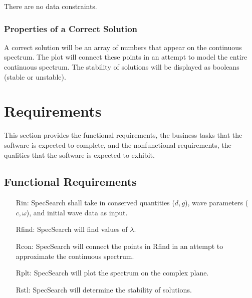 \documentclass[12pt]{article}
\begin{document}
There are no data constraints. 

\subsubsection{Properties of a Correct Solution} \label{sec_CorrectSolution}

\noindent
A correct solution will be an array of numbers that appear on the continuous 
spectrum. The plot will connect these points in an attempt to model the entire 
continuous spectrum. The stability of solutions will be displayed as booleans 
(stable or unstable).


\section{Requirements}

This section provides the functional requirements, the business tasks that the
software is expected to complete, and the nonfunctional requirements, the
qualities that the software is expected to exhibit.

\subsection{Functional Requirements}

\noindent \begin{itemize}

\item[Rin:] SpecSearch shall 
take in 
conserved quantities ($d,g$), wave parameters ($c,\omega$), and initial wave 
data 
as input. 

\item[Rfind:] SpecSearch 
will find values of $\lambda$.

\item[Rcon:] SpecSearch will 
connect the points in Rfind in an attempt to approximate the continuous 
spectrum. 

\item[Rplt:] SpecSearch 
will plot the spectrum on the complex plane. 

\item[Rstl:] SpecSearch 
will determine the stability of solutions.

\end{itemize}
\end{document}
